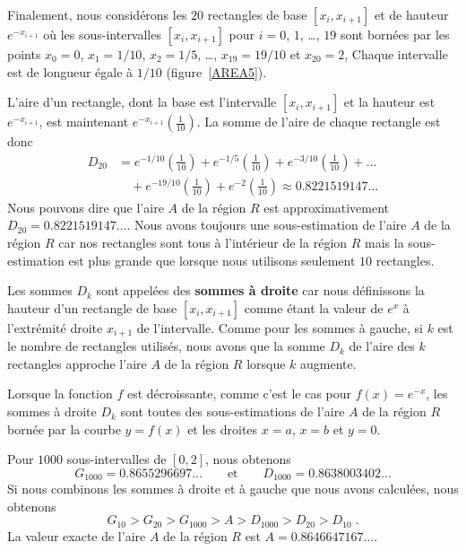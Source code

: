{Finalement, nous considérons les $20$ rectangles de base $[x_i,x_{i+1}]$
et de hauteur $e^{-x_{i+1}}$ où les sous-intervalles $[x_i,x_{i+1}]$
pour $i=0$, $1$, \ldots, $19$ sont bornées par les points $x_0 = 0$,
$x_1 = 1/10$, $x_2=1/5$, \ldots, $x_{19} = 19/10$ et $x_{20} = 2$,
Chaque intervalle est de longueur égale à $1/10$
(figure~\ref{AREA5}).


L'aire d'un rectangle, dont la base est l'intervalle $[x_i, x_{i+1}]$
et la hauteur est $e^{-x_{i+1}}$, est maintenant
$e^{-x_{i+1}} \left(\frac{1}{10}\right)$.  La somme de l'aire de chaque
rectangle est donc
\begin{align*}
D_{20} &= e^{-1/10} \left(\frac{1}{10}\right)
+ e^{-1/5} \left(\frac{1}{10}\right)
+ e^{-3/10} \left(\frac{1}{10}\right) + \ldots \\
& \quad + e^{-19/10} \left(\frac{1}{10}\right)
+ e^{-2} \left(\frac{1}{10}\right)  \approx 0.8221519147\ldots
\end{align*}
Nous pouvons dire que l'aire $A$ de la région $R$ est approximativement
$D_{20} = 0.8221519147\ldots$.  Nous avons toujours une sous-estimation de
l'aire $A$ de la région $R$ car nos rectangles sont tous à l'intérieur
de la région $R$ mais la sous-estimation est plus grande que lorsque
nous utilisons seulement $10$ rectangles.

Les sommes $D_k$ sont appelées des {\bfseries sommes à droite} car nous
définissons la hauteur d'un rectangle de base $[x_i, x_{i+1}]$ comme étant
la valeur de $e^x$ à l'extrémité droite $x_{i+1}$ de
l'intervalle. Comme pour les sommes à gauche, si $k$ est le nombre de
rectangles utilisés, nous avons que la somme $D_k$ de l'aire des $k$
rectangles approche l'aire $A$ de la région $R$ lorsque $k$
augmente. 

\begin{rmk}
Lorsque la fonction $f$ est décroissante, comme c'est le cas pour
$f(x)=e^{-x}$, les sommes à droite $D_k$ sont toutes des sous-estimations
de l'aire $A$ de la région $R$ bornée par la courbe $y=f(x)$ et les
droites $x=a$, $x=b$ et $y=0$.
\end{rmk}

Pour $1000$ sous-intervalles de $[0,2]$, nous obtenons
\[
G_{1000} = 0.8655296697\ldots \qquad \text{et} \qquad
D_{1000} = 0.8638003402\ldots
\]
Si nous combinons les sommes à droite et à gauche que nous avons
calculées, nous obtenons
\[
G_{10} > G_{20} > G_{1000} > A > D_{1000} > D_{20} > D_{10} \; .
\]
La valeur exacte de l'aire $A$ de la région $R$ est
$A = 0.8646647167\ldots$.

}

